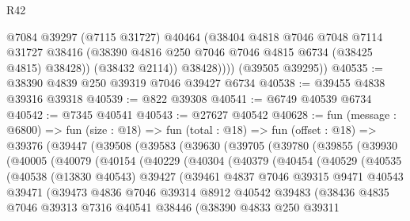 \begin{lexlean}{R42}
\begin{coremodule}
{                @7084
                @39297
                (@7115 @31727)
                @40464
                (@38404
                  @4818
                  @7046
                  @7048
                  @7114
                  @31727
                  @38416
                  (@38390 @4816 @250 @7046 @7046 @4815 @6734 (@38425 @4815) @38428))
                (@38432 @2114))
              @38428))))
      (@39505 @39295))
@40535 := @38390 @4839 @250 @39319 @7046 @39427 @6734
@40538 := @39455 @4838 @39316 @39318
@40539 := @822 @39308
@40541 := @6749 @40539 @6734
@40542 := @7345 @40541
@40543 := @27627 @40542
@40628 := fun (message : @6800) =>
  fun (size : @18) =>
  fun (total : @18) =>
  fun (offset : @18) =>
  @39376
    (@39447
      (@39508
        (@39583
          (@39630
            (@39705
              (@39780
                (@39855
                  (@39930
                    (@40005
                      (@40079
                        (@40154
                          (@40229
                            (@40304
                              (@40379
                                (@40454
                                  (@40529
                                    (@40535
                                      (@40538
                                        (@13830 @40543)
                                        @39427
                                        (@39461
                                          @4837
                                          @7046
                                          @39315
                                          @9471
                                          @40543
                                          @39471
                                          (@39473
                                            @4836
                                            @7046
                                            @39314
                                            @8912
                                            @40542
                                            @39483
                                            (@38436
                                              @4835
                                              @7046
                                              @39313
                                              @7316
                                              @40541
                                              @38446
                                              (@38390
                                                @4833
                                                @250
                                                @39311
}
\end{coremodule}
\end{lexlean}
